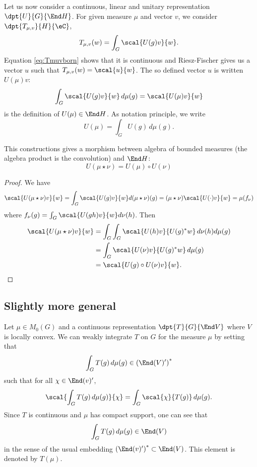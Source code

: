 Let us now consider a continuous, linear and unitary representation $\dpt{U}{G}{\End H}$. For given measure $\mu$ and vector $v$, we consider $\dpt{T_{\mu,v}}{H}{\eC}$,
\[
	T_{\mu,v}(w)=\int_G\scal{U(g)v}{w}.
\]
Equation \eqref{eq:Tmuvborn} shows that it is continuous and Riesz-Fischer gives us a vector $u$ such that $T_{\mu,v}(w)=\scal{u}{w}$. The so defined vector $u$ is written $U(\mu)v$:
\begin{equation}
	\int_G \scal{U(g)v}{w}\,d\mu(g)=\scal{U(\mu)v}{w}
\end{equation}
is the definition of $U(\mu)\in\End H$. As notation principle, we write
\[
	U(\mu)=\int_GU(g)\,d\mu(g).
\]

\begin{proposition}

	This constructions gives a morphism between algebra of bounded measures (the algebra product is the convolution) and $\End H$:
	\begin{equation}
		U( \mu\star\nu)=U(\mu)\circ U(\nu)
	\end{equation}

\end{proposition}


\begin{proof}
	We have
	\begin{equation}
		\scal{U(\mu\star\nu)v}{w}=\int_G \scal{U(g)v}{w}d(\mu\star\nu)(g)
		=(\mu\star\nu)\scal{U(\cdot)v}{w}
		=\mu(f_{\nu})
	\end{equation}
	where $f_{\nu}(g)=\int_G\scal{U(gh)v}{w}d\nu(h)$. Then
	\begin{equation}
		\begin{split}
			\scal{U(\mu\star\nu)v}{w}&=\int_G\int_G \scal{U(h)v}{U(g)^*w}\,d\nu(h)d\mu(g)\\
			&=\int_G\scal{U(\nu)v}{U(g)^*w}\,d\mu(g)\\
			&=\scal{U(g)\circ U(\nu)v}{w}.
		\end{split}
	\end{equation}
\end{proof}

\subsection{Slightly more general}

Let $\mu\in M_0(G)$ and a continuous representation $\dpt{T}{G}{\End V}$ where $V$ is locally convex. We can weakly integrate $T$ on $G$ for the measure $\mu$ by setting that
\[
	\int_G T(g)\,d\mu(g)\in\left( \End(V)' \right)^*
\]
such that for all $\chi\in\End(v)'$,
\begin{equation}
	\scal{\int_G T(g)\,d\mu(g)}{\chi}=\int_G\scal{\chi}{T(g)}\,d\mu(g).
\end{equation}
Since $T$ is continuous and $\mu$ has compact support, one can see that
\[
	\int_GT(g)\,d\mu(g)\in\End(V)
\]
in the sense of the usual embedding $\left( \End(v)' \right)^*\subset\End(V)$. This element is denoted by $T(\mu)$.

